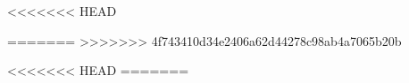 %
%
%
%
%
\def\imagepath{images/}
\def\backgroundimage{\imagepath./hintergrund}
\def\lineimage{\imagepath./linie}
\def\logoimage{\imagepath./logo}
\def\logowidth{1cm}
\def\logoheight{1cm}
\def\logoxshift{-0.7cm}
\def\logoyshift{-0.7cm}
\def\titleboxwidth{0.5\linewidth}
\def\sectionpagewidth{0.5\myPaperWidth}
\def\sectionpageheight{0.25\myPaperHeight}
\def\subsectionpagewidth{0.5\myPaperWidth}
\def\subsectionpageheight{0.25\myPaperHeight}

<<<<<<< HEAD



=======
>>>>>>> 4f743410d34e2406a62d44278c98ab4a7065b20b

\usepackage{ragged2e} %
\usepackage{ifthen}
\usepackage{tikz}
\usetikzlibrary{positioning}
\usetikzlibrary{calc}
\usetikzlibrary{backgrounds}
\usepackage{pgfplots}
\pgfplotsset{compat=1.3}
\usepackage{xspace}
\usepackage{array}
<<<<<<< HEAD
=======

